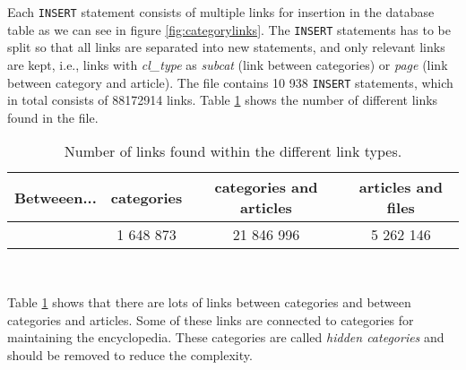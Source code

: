 Each \texttt{INSERT} statement consists of multiple links for insertion in the database table as we can see in figure \ref{fig:categorylinks}. The \texttt{INSERT} statements has to be split so that all links are separated into new statements, and only relevant links are kept, i.e.,  links with \emph{cl\_type} as \emph{subcat} (link between categories) or \emph{page} (link between category and article). The file \enwikicatlink contains 10 938 \texttt{INSERT} statements, which in total consists of 88172914 links. Table \ref{tab:enwikicatlinks} shows the number of different links found in the file. 

\begin{table}[ht]
\renewcommand{\arraystretch}{1.25}
\begin{tabularx}{\textwidth}{l|c|c|c} %
\textbf{Betweeen...} & \textbf{categories} &  \textbf{categories and articles} & \textbf{articles and files} \\\hline
 & 1 648 873 & 21 846 996 & 5 262 146
\end{tabularx}
\\[10pt]
\caption{Number of links found within the different link types.}
\label{tab:enwikicatlinks}
\end{table}



Table \ref{tab:enwikicatlinks} shows that there are lots of links between categories and between categories and articles. Some of these links are connected to categories for maintaining the encyclopedia. These categories are called \emph{hidden categories} and should be removed to reduce the complexity.
